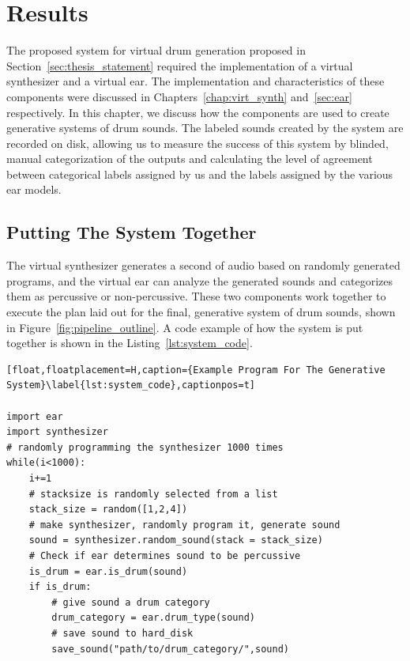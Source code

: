 \documentclass[\main/thesis.tex]{subfiles}
\begin{document}
\chapter{Results}
\label{chap:nov_gen}
The proposed system for virtual drum generation proposed in Section~\ref{sec:thesis_statement} required the implementation of a virtual synthesizer and a virtual ear. The implementation and characteristics of these components were discussed in Chapters~\ref{chap:virt_synth} and~\ref{sec:ear} respectively. In this chapter, we discuss how the components are used to create generative systems of drum sounds. The labeled sounds created by the system are recorded on disk, allowing us to measure the success of this system by blinded, manual categorization of the outputs and calculating the level of agreement between categorical labels assigned by us and the labels assigned by the various ear models. 

\newcommand{\decfirst}{\textit{Decision.1}}
\newcommand{\decsecond}{\textit{Decision.2}}
\section{Putting The System Together}
 The virtual synthesizer generates a second of audio based on randomly generated programs, and the virtual ear can analyze the generated sounds and categorizes them as percussive or non-percussive. These two components work together to execute the plan laid out for the final, generative system of drum sounds, shown in Figure~\ref{fig:pipeline_outline}. A code example of how the system is put together is shown in the Listing~\ref{lst:system_code}.

\begin{lstlisting}[float,floatplacement=H,caption={Example Program For The Generative System}\label{lst:system_code},captionpos=t]

import ear
import synthesizer
# randomly programming the synthesizer 1000 times 
while(i<1000):
    i+=1
    # stacksize is randomly selected from a list
    stack_size = random([1,2,4])
    # make synthesizer, randomly program it, generate sound
    sound = synthesizer.random_sound(stack = stack_size)
    # Check if ear determines sound to be percussive
    is_drum = ear.is_drum(sound)
    if is_drum:
        # give sound a drum category 
        drum_category = ear.drum_type(sound) 
        # save sound to hard_disk
        save_sound("path/to/drum_category/",sound) 
\end{lstlisting}
\end{document}
